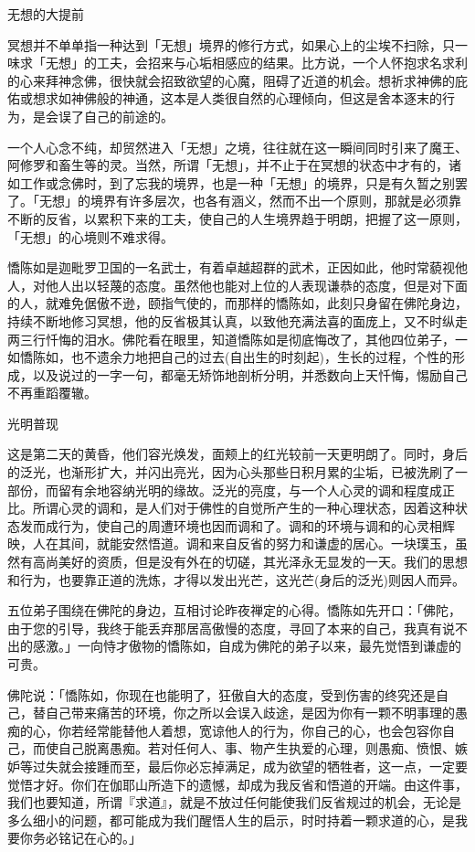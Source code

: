 \documentclass[12pt,twoside,openany]{book}
\begin{document}
无想的大提前

冥想并不单单指一种达到「无想」境界的修行方式，如果心上的尘埃不扫除，只一味求「无想」的工夫，会招来与心垢相感应的结果。比方说，一个人怀抱求名求利的心来拜神念佛，很快就会招致欲望的心魔，阻碍了近道的机会。想祈求神佛的庇佑或想求如神佛般的神通，这本是人类很自然的心理倾向，但这是舍本逐末的行为，是会误了自己的前途的。

一个人心念不纯，却贸然进入「无想」之境，往往就在这一瞬间同时引来了魔王、阿修罗和畜生等的灵。当然，所谓「无想」，并不止于在冥想的状态中才有的，诸如工作或念佛时，到了忘我的境界，也是一种「无想」的境界，只是有久暂之别罢了。「无想」的境界有许多层次，也各有涵义，然而不出一个原则，那就是必须靠不断的反省，以累积下来的工夫，使自己的人生境界趋于明朗，把握了这一原则，「无想」的心境则不难求得。

憍陈如是迦毗罗卫国的一名武士，有着卓越超群的武术，正因如此，他时常藐视他人，对他人出以轻蔑的态度。虽然他也能对上位的人表现谦恭的态度，但是对下面的人，就难免倨傲不逊，颐指气使的，而那样的憍陈如，此刻只身留在佛陀身边，持续不断地修习冥想，他的反省极其认真，以致他充满法喜的面庞上，又不时纵走两三行忏悔的泪水。佛陀看在眼里，知道憍陈如是彻底悔改了，其他四位弟子，一如憍陈如，也不遗余力地把自己的过去(自出生的时刻起)，生长的过程，个性的形成，以及说过的一字一句，都毫无矫饰地剖析分明，并悉数向上天忏悔，惕励自己不再重蹈覆辙。

光明普现

这是第二天的黄昏，他们容光焕发，面颊上的红光较前一天更明朗了。同时，身后的泛光，也渐形扩大，并闪出亮光，因为心头那些日积月累的尘垢，已被洗刷了一部份，而留有余地容纳光明的缘故。泛光的亮度，与一个人心灵的调和程度成正比。所谓心灵的调和，是人们对于佛性的自觉所产生的一种心理状态，因着这种状态发而成行为，使自己的周遭环境也因而调和了。调和的环境与调和的心灵相辉映，人在其间，就能安然悟道。调和来自反省的努力和谦虚的居心。一块璞玉，虽然有高尚美好的资质，但是没有外在的切磋，其光泽永无显发的一天。我们的思想和行为，也要靠正道的洗炼，才得以发出光芒，这光芒(身后的泛光)则因人而异。

五位弟子围绕在佛陀的身边，互相讨论昨夜禅定的心得。憍陈如先开口：「佛陀，由于您的引导，我终于能丢弃那居高傲慢的态度，寻回了本来的自己，我真有说不出的感激。」一向恃才傲物的憍陈如，自成为佛陀的弟子以来，最先觉悟到谦虚的可贵。

佛陀说：「憍陈如，你现在也能明了，狂傲自大的态度，受到伤害的终究还是自己，替自己带来痛苦的环境，你之所以会误入歧途，是因为你有一颗不明事理的愚痴的心，你若经常能替他人着想，宽谅他人的行为，你自己的心，也会包容你自己，而使自己脱离愚痴。若对任何人、事、物产生执爱的心理，则愚痴、愤恨、嫉妒等过失就会接踵而至，最后你必忘掉满足，成为欲望的牺牲者，这一点，一定要觉悟才好。你们在伽耶山所造下的遗憾，却成为我反省和悟道的开端。由这件事，我们也要知道，所谓『求道』，就是不放过任何能使我们反省规过的机会，无论是多么细小的问题，都可能成为我们醒悟人生的启示，时时持着一颗求道的心，是我要你务必铭记在心的。」
\end{document}
